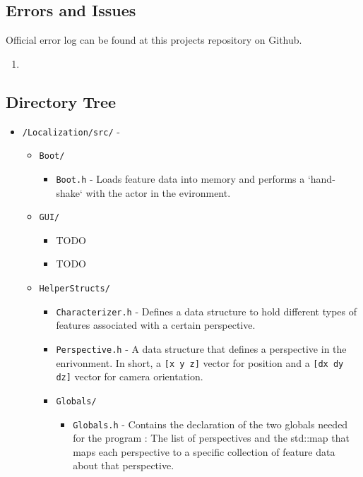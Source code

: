 \documentclass[a4paper,11pt]{article}
\begin{document}
  

  \subsection{Errors and Issues}
  Official error log can be found at this projects repository on Github.
  \begin{enumerate}
   \item 
  \end{enumerate}


  \subsection{Directory Tree}
  \begin{itemize}
    \item \texttt{/Localization/src/} -
    \begin{itemize}
      \item \texttt{Boot/}
        \begin{itemize}
	        \item \texttt{Boot.h} - Loads feature data into memory and performs a `hand-shake` with the actor in the evironment.
        \end{itemize}
      \item \texttt{GUI/}
        \begin{itemize}
          \item TODO
          \item TODO
        \end{itemize}
      \item \texttt{HelperStructs/}
        \begin{itemize}
          \item \texttt{Characterizer.h} - Defines a data structure to hold different types of features associated with a certain perspective.
          \item \texttt{Perspective.h} - A data structure that defines a perspective in the enrivonment. In short, a \texttt{[x y z]} vector for position and a 	      \texttt{[dx dy dz]} vector for camera orientation.
          \item \texttt{Globals/}
            \begin{itemize}
	      \item \texttt{Globals.h} - Contains the declaration of the two globals needed for the program : The list of perspectives and the std::map that maps each perspective to a specific collection of feature data about that perspective.

\end{itemize}
\end{itemize}
\end{itemize}
\end{itemize}
\end{document}
